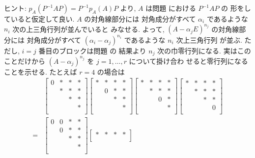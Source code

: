 \documentclass[12pt,twoside]{jarticle}
\begin{document}
\noindent
ヒント: $p_A(P^{-1}AP)=P^{-1}p_A(A)P$ より, 
$A$ は問題  における $P^{-1}AP$ の
形をしていると仮定して良い.  $A$ の対角線部分には
対角成分がすべて $\alpha_i$ であるような $n_i$ 次の上三角行列が並んでいると
みなせる.  よって, $(A-\alpha_j E)^{n_j}$ の対角線部分には
対角成分がすべて $(\alpha_i-\alpha_j)^{n_i}$ であるような $n_i$ 次上三角行列
が並ぶ.  ただし, $i=j$ 番目のブロックは問題  の
結果より $n_j$ 次の巾零行列になる.  
実はこのことだけから $(A-\alpha_j)^{n_j}$ を $j=1,\dots,r$ について掛け合わ
せると零行列になることを示せる.  たとえば $r=4$ の場合は
\begin{align*}
  &
  \begin{bmatrix}
    0 & * & * & * \\
      & * & * & * \\
      &   & * & * \\
      &   &   & * \\
  \end{bmatrix}
  \begin{bmatrix}
    * & * & * & * \\
      & 0 & * & * \\
      &   & * & * \\
      &   &   & * \\
  \end{bmatrix}
  \begin{bmatrix}
    * & * & * & * \\
      & * & * & * \\
      &   & 0 & * \\
      &   &   & * \\
  \end{bmatrix}
  \begin{bmatrix}
    * & * & * & * \\
      & * & * & * \\
      &   & * & * \\
      &   &   & 0 \\
  \end{bmatrix}
  \\
  = &
  \begin{bmatrix}
    0 & 0 & * & * \\
      & 0 & * & * \\
      &   & * & * \\
      &   &   & * \\
  \end{bmatrix}
  \begin{bmatrix}
    * & * & * & * \\

\end{bmatrix}
\end{align*}
\end{document}
